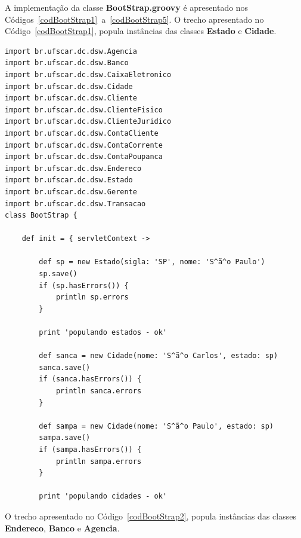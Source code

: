 A   implementação   da  classe   {\bf   BootStrap.groovy}   é  apresentado   nos
Códigos~\ref{codBootStrap1}~a~\ref{codBootStrap5}.   O   trecho  apresentado  no
Código~\ref{codBootStrap1}, popula  instâncias das  classes {\bf Estado}  e {\bf
  Cidade}.

\begin{lstlisting}[caption={\bf BootStrap.groovy (1)}, frame = trBL, float=htbp,
    label=codBootStrap1] 
import br.ufscar.dc.dsw.Agencia
import br.ufscar.dc.dsw.Banco
import br.ufscar.dc.dsw.CaixaEletronico
import br.ufscar.dc.dsw.Cidade
import br.ufscar.dc.dsw.Cliente
import br.ufscar.dc.dsw.ClienteFisico
import br.ufscar.dc.dsw.ClienteJuridico
import br.ufscar.dc.dsw.ContaCliente
import br.ufscar.dc.dsw.ContaCorrente
import br.ufscar.dc.dsw.ContaPoupanca
import br.ufscar.dc.dsw.Endereco
import br.ufscar.dc.dsw.Estado
import br.ufscar.dc.dsw.Gerente
import br.ufscar.dc.dsw.Transacao
class BootStrap {

    def init = { servletContext ->       

        def sp = new Estado(sigla: 'SP', nome: 'S^ã^o Paulo')
        sp.save()
        if (sp.hasErrors()) {
            println sp.errors
        }
        
        print 'populando estados - ok'
        
        def sanca = new Cidade(nome: 'S^ã^o Carlos', estado: sp)        
        sanca.save()
        if (sanca.hasErrors()) {
            println sanca.errors
        }
        
        def sampa = new Cidade(nome: 'S^ã^o Paulo', estado: sp)
        sampa.save()
        if (sampa.hasErrors()) {
            println sampa.errors
        }
        
        print 'populando cidades - ok'
\end{lstlisting}

\newpage

O  trecho  apresentado  no  Código~\ref{codBootStrap2},  popula  instâncias  das
classes {\bf Endereco}, {\bf Banco} e {\bf Agencia}.

